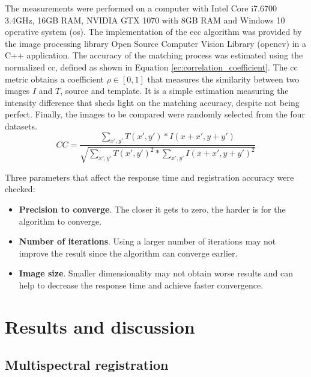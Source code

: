 The measurements were performed on a computer with Intel Core i7.6700 3.4GHz, 16GB RAM, NVIDIA GTX 1070 with 8GB RAM and Windows 10 operative system (\acrshort{os}). The implementation of the \acrshort{ecc} algorithm was provided by the image processing library Open Source Computer Vision Library (\acrshort{opencv}) in a C++ application. The accuracy of the matching process was estimated using the normalized \acrshort{cc}, defined as shown in Equation \ref{ec:correlation_coefficient}. The \acrshort{cc} metric obtains a coefficient $\rho \in [0, 1]$ that measures the similarity between two images $I$ and $T$, source and template. It is a simple estimation measuring the intensity difference that sheds light on the matching accuracy, despite not being perfect. Finally, the images to be compared were randomly selected from the four datasets.
\begin{equation}
    \label{ec:correlation_coefficient}
    \textit{CC} = \frac{\sum_{x',y'} T(x',y') * I(x + x', y + y')}{\sqrt{\sum_{x',y'}T(x',y')^{2} * \sum_{x',y'}I(x + x',y + y')^{2}}}
\end{equation}

Three parameters that affect the response time and registration accuracy were checked: 
\begin{itemize}
    \item \textbf{Precision to converge}. The closer it gets to zero, the harder is for the algorithm to converge.
    \item \textbf{Number of iterations}. Using a larger number of iterations may not improve the result since the algorithm can converge earlier.
    \item \textbf{Image size}. Smaller dimensionality may not obtain worse results and can help to decrease the response time and achieve faster convergence. 
\end{itemize}

\section{Results and discussion}

\subsection{Multispectral registration}


